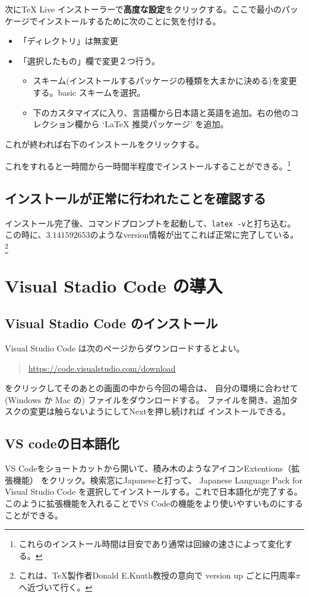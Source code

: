 \documentclass[titlepage]{ltjsarticle}
\begin{document}
次にTeX Live インストーラーで\textbf{高度な設定}をクリックする。ここで最小のパッケージでインストールするために次のことに気を付ける。
\begin{itemize}
  \item 「ディレクトリ」は無変更
  \item 「選択したもの」欄で変更２つ行う。
  \begin{itemize}
    \item スキーム(インストールするパッケージの種類を大まかに決める)を変更する。basic スキームを選択。
    \item 下のカスタマイズに入り、言語欄から日本語と英語を追加。右の他のコレクション欄から `LaTeX 推奨パッケージ' を追加。
  \end{itemize}
\end{itemize}
これが終われば右下のインストールをクリックする。

これをすれると一時間から一時間半程度でインストールすることができる。\footnote{これらのインストール時間は目安であり通常は回線の速さによって変化する。}

\subsection{インストールが正常に行われたことを確認する}
インストール完了後、コマンドプロンプトを起動して、\verb|latex -v|と打ち込む。
この時に、$3.141592653$のようなversion情報が出てこれば正常に完了している。
\footnote{
  これは、\TeX 製作者Donald E.Knuth教授の意向で
  version up ごとに円周率$\pi$へ近づいて行く。
}

\section{Visual Stadio Code の導入}
\subsection{Visual Stadio Code のインストール}
Visual Studio Code は次のページからダウンロードするとよい。
\begin{quote}
	\url{https://code.visualstudio.com/download}
\end{quote}
をクリックしてそのあとの画面の中から今回の場合は、
自分の環境に合わせて (Windows か Mac の) ファイルをダウンロードする。
ファイルを開き、追加タスクの変更は触らないようにしてNextを押し続ければ
インストールできる。
\subsection{VS codeの日本語化}
VS Codeをショートカットから開いて、積み木のようなアイコンExtentions（拡張機能）
をクリック。検索窓にJapaneseと打って、
Japanese Language Pack for Visual Studio Code
を選択してインストールする。これで日本語化が完了する。
このように拡張機能を入れることでVS Codeの機能をより使いやすいものにすることができる。
\end{document}
